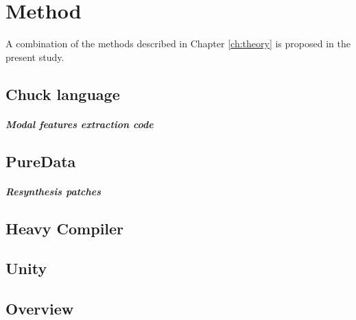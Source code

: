 \chapter{Method}\label{ch:method}
\mbox{}\par
A combination of the methods described in Chapter \ref{ch:theory} is proposed in the present
study.


\section{Chuck language}
\mbox{}\par

\paragraph{Modal features extraction code}
\mbox{}\par

\section{PureData}
\paragraph{Resynthesis patches}
\mbox{}\par

\section{Heavy Compiler}

\section{Unity}

\section{Overview}